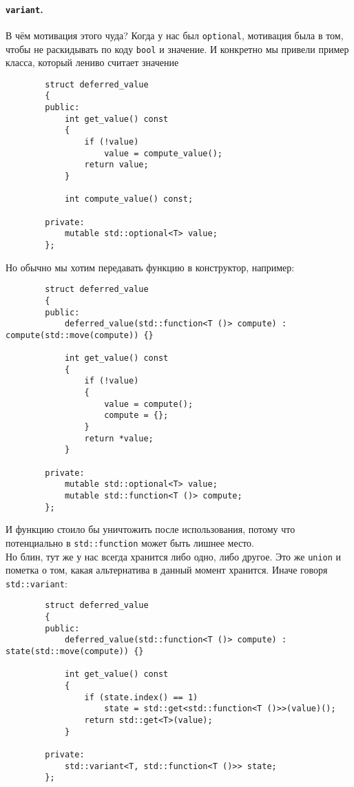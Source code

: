 \documentclass{article}
\begin{document}
    \paragraph{\texttt{variant}.}
    В чём мотивация этого чуда? Когда у нас был \texttt{optional}, мотивация была в том, чтобы не раскидывать по коду \texttt{bool} и значение. И конкретно мы привели пример класса, который лениво считает значение
    \begin{verbatim}
        struct deferred_value
        {
        public:
            int get_value() const
            {
                if (!value)
                    value = compute_value();
                return value;
            }
            
            int compute_value() const;
            
        private:
            mutable std::optional<T> value;
        };
    \end{verbatim}
    Но обычно мы хотим передавать функцию в конструктор, например:
    \pagebreak
    \begin{verbatim}
        struct deferred_value
        {
        public:
            deferred_value(std::function<T ()> compute) : compute(std::move(compute)) {}

            int get_value() const
            {
                if (!value)
                {
                    value = compute();
                    compute = {};
                }
                return *value;
            }
            
        private:
            mutable std::optional<T> value;
            mutable std::function<T ()> compute;
        };
    \end{verbatim}
    И функцию стоило бы уничтожить после использования, потому что потенциально в \texttt{std::function} может быть лишнее место.\\
    Но блин, тут же у нас всегда хранится либо одно, либо другое. Это же \texttt{union} и пометка о том, какая альтернатива в данный момент хранится. Иначе говоря \texttt{std::variant}:
    \begin{verbatim}
        struct deferred_value
        {
        public:
            deferred_value(std::function<T ()> compute) : state(std::move(compute)) {}
            
            int get_value() const
            {
                if (state.index() == 1)
                    state = std::get<std::function<T ()>>(value)();
                return std::get<T>(value);
            }
            
        private:
            std::variant<T, std::function<T ()>> state;
        };
    \end{verbatim}
\end{document}
